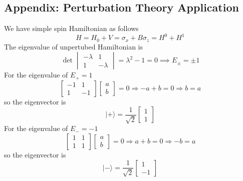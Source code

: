 \documentclass[../../../main.tex]{subfiles}
\begin{document}
\subsection{Appendix: Perturbation Theory Application}
We have simple spin Hamiltonian as follows
\begin{equation*}
    H = H_0+V = \sigma_x + B \sigma_z = H^0 +H^1
\end{equation*}
The eigenvalue of unpertubed Hamiltonian is 
\begin{equation*}
\det\begin{vmatrix}
-\lambda & 1 \\
1 & -\lambda
\end{vmatrix} = \lambda^2 - 1 = 0
    \implies E_\pm=\pm 1
\end{equation*}
For the eigenvalue of $E_+=1$
\begin{equation*}
\begin{bmatrix}
-1 & 1 \\
1 & -1
\end{bmatrix}
\begin{bmatrix}
a \\
b
\end{bmatrix}
= 0 \Rightarrow -a + b = 0 \Rightarrow b = a
\end{equation*}
so the eigenvector is 
\begin{equation*}
|+\rangle = \frac{1}{\sqrt{2}} \begin{bmatrix}
1 \\
1
\end{bmatrix}
\end{equation*}
For the eigenvalue of $E_-=-1$
\begin{equation*}
\begin{bmatrix}
1 & 1 \\
1 & 1
\end{bmatrix}
\begin{bmatrix}
a \\
b
\end{bmatrix}
= 0 \Rightarrow a + b = 0 \Rightarrow -b = a
\end{equation*}
so the eigenvector is 
\begin{equation*}
|-\rangle = \frac{1}{\sqrt{2}} \begin{bmatrix}
1 \\
-1
\end{bmatrix}
\end{equation*}
\end{document}
